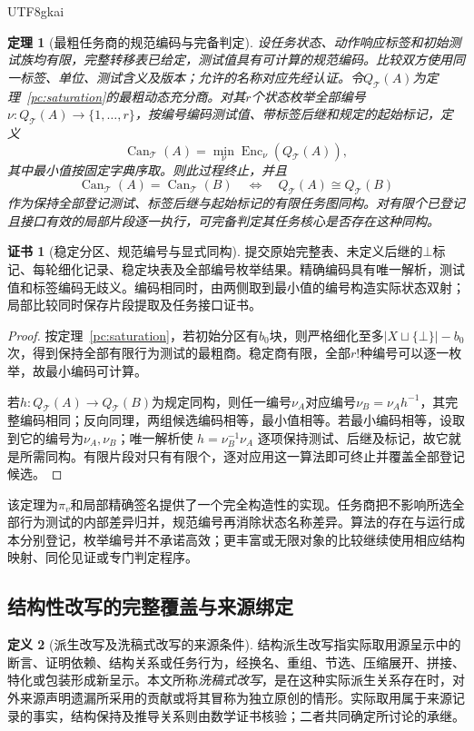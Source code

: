\documentclass[11pt,a4paper]{article}
\theoremstyle{plain}
\newtheorem{theorem}{定理}[section]
\theoremstyle{definition}
\newtheorem{definition}[theorem]{定义}
\newtheorem*{certificate}{证书}
\theoremstyle{remark}
\begin{document}
\begin{CJK*}{UTF8}{gkai}
\begin{theorem}[最粗任务商的规范编码与完备判定]
\label{ar:canonical}
设任务状态、动作响应标签和初始测试族均有限，完整转移表已给定，测试值具有可计算的规范编码。比较双方使用同一标签、单位、测试含义及版本；允许的名称对应先经认证。令$Q_{\mathcal T}(A)$为定理~\ref{pc:saturation}的最粗动态充分商。对其$r$个状态枚举全部编号$\nu:Q_{\mathcal T}(A)\to\{1,\ldots,r\}$，按编号编码测试值、带标签后继和规定的起始标记，定义
\[
 \operatorname{Can}_{\mathcal T}(A)
 =\min_{\nu}\operatorname{Enc}_{\nu}(Q_{\mathcal T}(A)),
\]
其中最小值按固定字典序取。则此过程终止，并且
\[
 \operatorname{Can}_{\mathcal T}(A)=\operatorname{Can}_{\mathcal T}(B)
 \quad\Longleftrightarrow\quad
 Q_{\mathcal T}(A)\cong Q_{\mathcal T}(B)
\]
作为保持全部登记测试、标签后继与起始标记的有限任务图同构。对有限个已登记且接口有效的局部片段逐一执行，可完备判定其任务核心是否存在这种同构。
\end{theorem}
\begin{certificate}[稳定分区、规范编号与显式同构]
提交原始完整表、未定义后继的$\bot$标记、每轮细化记录、稳定块表及全部编号枚举结果。精确编码具有唯一解析，测试值和标签编码无歧义。编码相同时，由两侧取到最小值的编号构造实际状态双射；局部比较同时保存片段提取及任务接口证书。
\end{certificate}
\begin{proof}
按定理~\ref{pc:saturation}，若初始分区有$b_0$块，则严格细化至多$|X\sqcup\{\bot\}|-b_0$次，得到保持全部有限行为测试的最粗商。稳定商有限，全部$r!$种编号可以逐一枚举，故最小编码可计算。

若$h:Q_{\mathcal T}(A)\to Q_{\mathcal T}(B)$为规定同构，则任一编号$\nu_A$对应编号$\nu_B=\nu_Ah^{-1}$，其完整编码相同；反向同理，两组候选编码相等，最小值相等。若最小编码相等，设取到它的编号为$\nu_A,\nu_B$；唯一解析使
$h=\nu_B^{-1}\nu_A$
逐项保持测试、后继及标记，故它就是所需同构。有限片段对只有有限个，逐对应用这一算法即可终止并覆盖全部登记候选。
\end{proof}

该定理为$\pi_v$和局部精确签名提供了一个完全构造性的实现。任务商把不影响所选全部行为测试的内部差异归并，规范编号再消除状态名称差异。算法的存在与运行成本分别登记，枚举编号并不承诺高效；更丰富或无限对象的比较继续使用相应结构映射、同伦见证或专门判定程序。

\subsection{结构性改写的完整覆盖与来源绑定}
\label{ar:coverage}

\begin{definition}[派生改写及洗稿式改写的来源条件]
结构派生改写指实际取用源呈示中的断言、证明依赖、结构关系或任务行为，经换名、重组、节选、压缩展开、拼接、特化或包装形成新呈示。本文所称\emph{洗稿式改写}，是在这种实际派生关系存在时，对外来源声明遗漏所采用的贡献或将其冒称为独立原创的情形。实际取用属于来源记录的事实，结构保持及推导关系则由数学证书核验；二者共同确定所讨论的承继。
\end{definition}


\end{CJK*}
\end{document}
